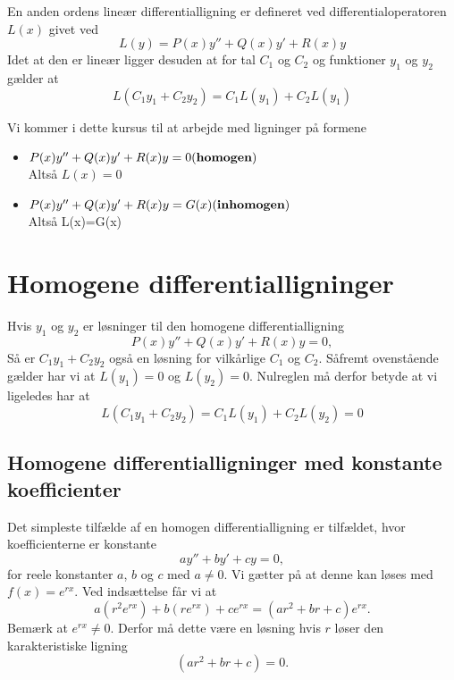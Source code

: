 \begin{definition}
  En anden ordens lineær differentialligning er defineret ved differentialoperatoren $L(x)$ givet ved
  \begin{equation}
    L(y)=P(x)y''+Q(x)y' + R(x)y  
  \end{equation}
  Idet at den er lineær ligger desuden at for tal $C_1$ og $C_2$ og funktioner $y_1$ og $y_2$ gælder at
  \begin{equation*}
    L(C_1y_1+C_2y_2) = C_1L(y_1) + C_2L(y_1)
  \end{equation*}
\end{definition}
Vi kommer i dette kursus til at arbejde med ligninger på formene
\begin{itemize}
  \item $P(x)y'' + Q(x)y' + R(x)y = 0 \hfill (\textbf{homogen})$ \\
    Altså $L(x)=0$
  \item $P(x)y'' + Q(x)y' + R(x)y = G(x)  \hfill (\textbf{inhomogen})$\\
    Altså L(x)=G(x)
\end{itemize}

\section{Homogene differentialligninger}
\begin{sæt}[Superpositionsprincippet]
  Hvis $y_1$ og $y_2$ er løsninger til den homogene differentialligning
  \begin{equation*}
    P(x)y'' + Q(x)y' + R(x)y = 0,
  \end{equation*}
  Så er $C_1y_1+C_2y_2$ også en løsning for vilkårlige $C_1$ og $C_2$.
  \tcblower
  Såfremt ovenstående gælder har vi at $L(y_1)=0$ og $L(y_2)=0$. Nulreglen må derfor betyde at vi ligeledes har at
  \begin{equation*}
    L(C_1y_1+C_2y_2) = C_1L(y_1) + C_2L(y_2) = 0
  \end{equation*}
\end{sæt}

\subsection{Homogene differentialligninger med konstante koefficienter}
Det simpleste tilfælde af en homogen differentialligning er tilfældet, hvor koefficienterne er konstante
\begin{equation}
  ay'' + by' + cy = 0,
\end{equation}
for reele konstanter $a$, $b$ og $c$ med $a \neq 0$. Vi gætter på at denne kan løses med $f(x) = e^{rx}$. Ved indsættelse får vi at
\[
  a(r^2e^{rx})+b(re^{rx})+ce^{rx} = (ar^2 + br + c)e^{rx}  
.\]
Bemærk at $e^{rx} \neq 0$. Derfor må dette være en løsning hvis $r$ løser den karakteristiske ligning
\[
  \left( ar^2 +br+c \right) = 0
.\]
